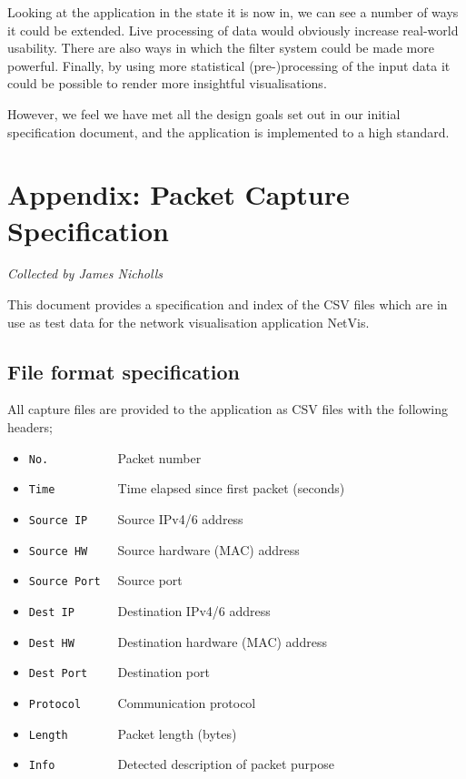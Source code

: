 \documentclass[12pt,a4paper]{article}
\begin{document}
        Looking at the application in the state it is now in, we can see a number of ways it could be extended. Live processing of data would obviously increase real-world usability. There are also ways in which the filter system could be made more powerful. Finally, by using more statistical (pre-)processing of the input data it could be possible to render more insightful visualisations.
	
        However, we feel we have met all the design goals set out in our initial specification document, and the application is implemented to a high standard.
	
	\newpage
	\section*{Appendix: Packet Capture Specification}
	
	\textit{Collected by James Nicholls}
	
	This document provides a specification and index of the CSV files
	which are in use as test data for the network visualisation
	application NetVis.
	
	\subsection*{File format specification}
	All capture files are provided to the application as CSV files
	with the following headers;
	
	\begin{itemize}
		\setlength{\itemsep}{0pt}
		\item \verb!No.          ! Packet number
		\item \verb!Time         ! Time elapsed since first packet (seconds)
		\item \verb!Source IP    ! Source IPv4/6 address
		\item \verb!Source HW    ! Source hardware (MAC) address
		\item \verb!Source Port  ! Source port
		\item \verb!Dest IP      ! Destination IPv4/6 address
		\item \verb!Dest HW      ! Destination hardware (MAC) address
		\item \verb!Dest Port    ! Destination port
		\item \verb!Protocol     ! Communication protocol
		\item \verb!Length       ! Packet length (bytes)
		\item \verb!Info         ! Detected description of packet purpose
	\end{itemize}
	
\end{document}
